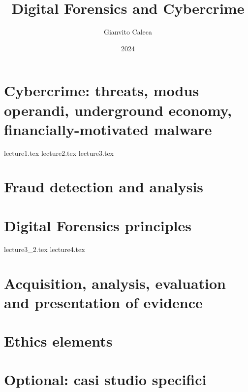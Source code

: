 \documentclass{report}
\title{Digital Forensics and Cybercrime}
\date{2024}
\author{Gianvito Caleca}
\begin{document}
\maketitle
\tableofcontents
\part{Cybercrime: threats, modus operandi, underground economy, financially-motivated malware}
{lecture1.tex}
{lecture2.tex}
{lecture3.tex}
\part{Fraud detection and analysis}
\part{Digital Forensics principles}
{lecture3_2.tex}
{lecture4.tex}
\part{Acquisition, analysis, evaluation and presentation of evidence}
\part{Ethics elements}
\part{Optional: casi studio specifici}
\end{document}
